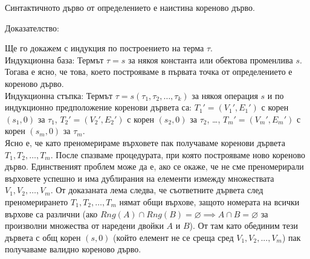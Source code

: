 \documentclass[12pt,twoside,a4paper]{article}
\begin{document}
	\begin{statement}\label{stmnt:tree-corr} Синтактичното дърво от определението е наистина кореново дърво.
		
		\noindent Доказателство:
		
		Ще го докажем с индукция по построението на терма $\tau$.\\
		\indent Индукционна база: Термът $\tau = s$ за някоя константа или обектова променлива $s$.\\
		Тогава е ясно, че това, което построяваме в първата точка от определението е кореново дърво.\\
		\indent Индукционна стъпка: Термът $\tau = s(\tau_1, \tau_2, \dots, \tau_k)$ за някоя операция $s$ и по индукционно предположение коренови дървета са: $T_1'=(V_1',E_1')$ с корен $(s_1, 0)$ за $\tau_1$, $T_2'=(V_2',E_2')$ с корен $(s_2, 0)$ за $\tau_2$, \dots, $T_m'=(V_m',E_m')$ с корен $(s_m, 0)$ за $\tau_m$.\\
		Ясно е, че като преномерираме върховете пак получаваме коренови дървета $T_1, T_2, \dots, T_m$. После спазваме процедурата, при която построяваме ново кореново дърво. Единственият проблем може да е, ако се окаже, че не сме преномерирали върховете успешно и има дублирания на елементи измежду множествата $V_1, V_2, \dots, V_m$. От доказаната лема следва, че съответните дървета след преномерирането $T_1, T_2, \dots, T_m$ нямат общи върхове, защото номерата на всички върхове са различни (ако $Rng(A) \cap Rng(B) = \varnothing \implies A \cap B = \varnothing$ за произволни множества от наредени двойки $A$ и $B$). От там като обединим тези дървета с общ корен $(s,0)$ (който елемент не се среща сред $V_1, V_2, ..., V_m$) пак получаваме валидно кореново дърво.
	\end{statement}
	
\end{document}
